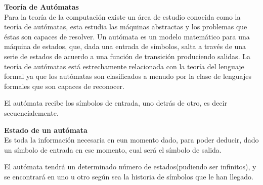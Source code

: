 \documentclass[12pt]{article}
\begin{document}
	\noindent\textbf{Teoría de Autómatas} \\
	Para la teoría de la computación existe un área de estudio conocida como la teoría de autómatas, 
	esta estudia las máquinas abstractas y los problemas que éstas son capaces de resolver.
	Un autómata es un modelo matemático para una máquina de estados, que, dada una entrada de 
	símbolos, salta a través de una serie de estados de acuerdo a una función de transición produciendo 
	salidas. La teoría de autómatas está estrechamente relacionada con la teoría del lenguaje formal ya que los 
	autómatas son clasificados a menudo por la clase de lenguajes formales que son capaces de reconocer.

	El autómata recibe los símbolos de entrada, uno detrás de otro, es decir secuencialemente.

	\noindent\textbf{Estado de un autómata} \\
	Es toda la información necesaria en eun momento dado, para poder deducir, dado un símbolo de entrada 
	en ese momento, cual será el símbolo de salida.  

	El autómata tendrá un determinado número de estados(pudiendo ser infinitos), y se encontrará en uno 
	u otro según sea la historia de símbolos que le han llegado.
\end{document}

